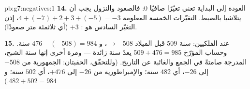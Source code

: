 \begin{solution}{pb:g7:negatives:1}
\textbf{14.} العودة إلى البداية تعني تغيّرًا صافيًا $0$: فالصعود
والنزول يجب أن يتلاشيا بالضبط.  التغيّرات الخمسة المعلومة
$4 + (-7) + 2 + 3 + (-5) = -3$، إذن التغيّر السادس هو
: $+3$ (أي ثلاثمئة متر صعودًا).

\textbf{15.} عند الفلكيين: سنة $509$ قبل الميلاد $\to -508$، و
$476 - (-508) = 984$ سنة. وحساب المؤرّخ $509 + 476 = 985$
يعدّ سنة زائدة --- ومرة أخرى إنها سنة  الشبح،
المدرجة صامتةً في الجمع والغائبة عن التاريخ.
(وللتحقّق، الحقبتان: الجمهورية من $-508$ إلى $-26$، أي $482$
سنة؛ والإمبراطورية من $-26$ إلى $+476$، أي $502$ سنة؛
و $482 + 502 = 984$.)
\end{solution}
